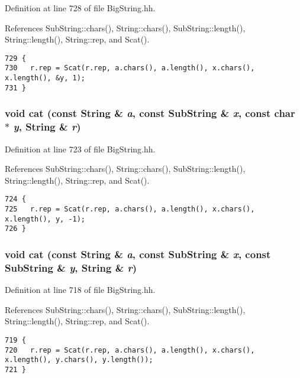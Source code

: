 Definition at line 728 of file Big\-String.hh.

References Sub\-String::chars(), String::chars(), Sub\-String::length(), String::length(), String::rep, and Scat().



\footnotesize\begin{verbatim}729 {
730   r.rep = Scat(r.rep, a.chars(), a.length(), x.chars(), x.length(), &y, 1);
731 }
\end{verbatim}\normalsize 
{}
\subsubsection{\setlength{\rightskip}{0pt plus 5cm}void cat (const {\bf String} \& {\em a}, const {\bf Sub\-String} \& {\em x}, const char $\ast$ {\em y}, {\bf String} \& {\em r})\hspace{0.3cm}{\tt  [inline]}}\label{BigString_8hh_a52}




Definition at line 723 of file Big\-String.hh.

References Sub\-String::chars(), String::chars(), Sub\-String::length(), String::length(), String::rep, and Scat().



\footnotesize\begin{verbatim}724 {
725   r.rep = Scat(r.rep, a.chars(), a.length(), x.chars(), x.length(), y, -1);
726 }
\end{verbatim}\normalsize 
{}
\subsubsection{\setlength{\rightskip}{0pt plus 5cm}void cat (const {\bf String} \& {\em a}, const {\bf Sub\-String} \& {\em x}, const {\bf Sub\-String} \& {\em y}, {\bf String} \& {\em r})\hspace{0.3cm}{\tt  [inline]}}\label{BigString_8hh_a51}




Definition at line 718 of file Big\-String.hh.

References Sub\-String::chars(), String::chars(), Sub\-String::length(), String::length(), String::rep, and Scat().



\footnotesize\begin{verbatim}719 {
720   r.rep = Scat(r.rep, a.chars(), a.length(), x.chars(), x.length(), y.chars(), y.length());
721 }
\end{verbatim}\normalsize 
{}

